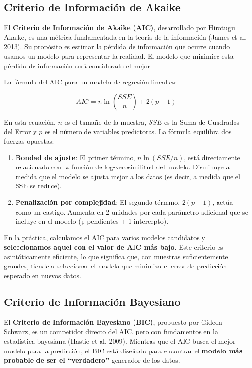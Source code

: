 \documentclass[
  letterpaper,
  DIV=11,
  numbers=noendperiod]{scrreprt}
\providecommand{\tightlist}{%
  \setlength{\itemsep}{0pt}\setlength{\parskip}{0pt}}
\begin{document}
\subsection{Criterio de Información de
Akaike}\label{criterio-de-informaciuxf3n-de-akaike}

El \textbf{Criterio de Información de Akaike (AIC)}, desarrollado por
Hirotugu Akaike, es una métrica fundamentada en la teoría de la
información (James et al. 2013). Su propósito es estimar la pérdida de
información que ocurre cuando usamos un modelo para representar la
realidad. El modelo que minimice esta pérdida de información será
considerado el mejor.

La fórmula del AIC para un modelo de regresión lineal es:

\[AIC = n \ln\left(\frac{SSE}{n}\right) + 2(p+1)\]

En esta ecuación, \(n\) es el tamaño de la muestra, \(SSE\) es la Suma
de Cuadrados del Error y \(p\) es el número de variables predictoras. La
fórmula equilibra dos fuerzas opuestas:

\begin{enumerate}
\def\labelenumi{\arabic{enumi}.}
\tightlist
\item
  \textbf{Bondad de ajuste}: El primer término, \(n \ln(SSE/n)\), está
  directamente relacionado con la función de log-verosimilitud del
  modelo. Disminuye a medida que el modelo se ajusta mejor a los datos
  (es decir, a medida que el SSE se reduce).
\item
  \textbf{Penalización por complejidad}: El segundo término, \(2(p+1)\),
  actúa como un castigo. Aumenta en 2 unidades por cada parámetro
  adicional que se incluye en el modelo (p pendientes + 1 intercepto).
\end{enumerate}

En la práctica, calculamos el AIC para varios modelos candidatos y
\textbf{seleccionamos aquel con el valor de AIC más bajo}. Este criterio
es asintóticamente eficiente, lo que significa que, con muestras
suficientemente grandes, tiende a seleccionar el modelo que minimiza el
error de predicción esperado en nuevos datos.

\subsection{Criterio de Información
Bayesiano}\label{criterio-de-informaciuxf3n-bayesiano}

El \textbf{Criterio de Información Bayesiano (BIC)}, propuesto por
Gideon Schwarz, es un competidor directo del AIC, pero con fundamentos
en la estadística bayesiana (Hastie et al. 2009). Mientras que el AIC
busca el mejor modelo para la predicción, el BIC está diseñado para
encontrar el \textbf{modelo más probable de ser el ``verdadero''}
generador de los datos.
\end{document}
